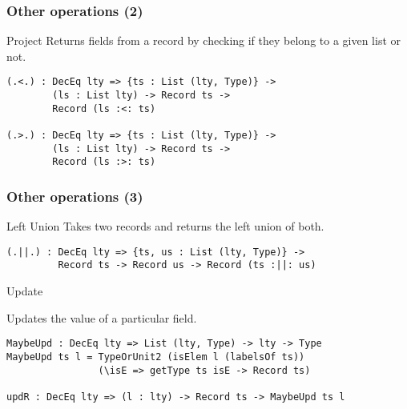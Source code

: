 \documentclass{beamer}
\begin{document}
\begin{frame}[fragile]
\frametitle{Other operations (2)}

\begin{block}{Project}
Returns fields from a record by checking if they belong to a given list or not.

\begin{definition}
\begin{verbatim}
(.<.) : DecEq lty => {ts : List (lty, Type)} -> 
        (ls : List lty) -> Record ts -> 
        Record (ls :<: ts)

(.>.) : DecEq lty => {ts : List (lty, Type)} -> 
        (ls : List lty) -> Record ts -> 
        Record (ls :>: ts)
\end{verbatim}
\end{definition}

\end{block}

\end{frame}

\begin{frame}[fragile]
\frametitle{Other operations (3)}

\begin{block}{Left Union}
Takes two records and returns the left union of both.

\begin{definition}
\begin{verbatim}
(.||.) : DecEq lty => {ts, us : List (lty, Type)} -> 
         Record ts -> Record us -> Record (ts :||: us)
\end{verbatim}
\end{definition}

\end{block}

\begin{block}{Update}

Updates the value of a particular field.

\begin{definition}
\begin{verbatim}
MaybeUpd : DecEq lty => List (lty, Type) -> lty -> Type
MaybeUpd ts l = TypeOrUnit2 (isElem l (labelsOf ts))
                (\isE => getType ts isE -> Record ts)

updR : DecEq lty => (l : lty) -> Record ts -> MaybeUpd ts l
\end{verbatim}
\end{definition}

\end{block}
\end{frame}
\end{document}
